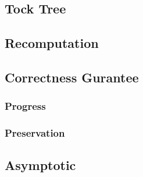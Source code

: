 \subsection{Tock Tree}
\subsection{Recomputation}
\subsection{Correctness Gurantee}
\subsubsection{Progress}
\subsubsection{Preservation}
\subsection{Asymptotic}
